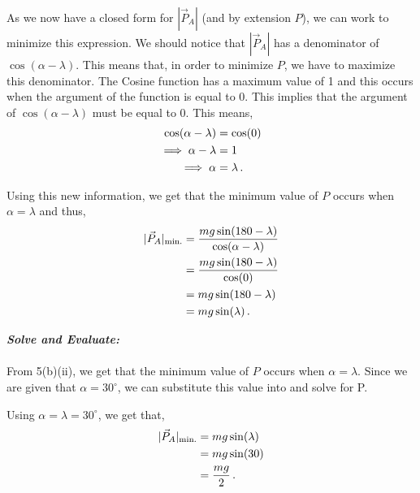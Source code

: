 \begin{subquestions}
\begin{subsubquestions}
	As we now have a closed form for $|\vec{P}_{A}|$ (and by extension $P$), we can work to minimize this expression. We should notice that $|\vec{P}_{A}|$ has a denominator of $\cos(\alpha - \lambda)$. This means that, in order to minimize $P$, we have to maximize this denominator. The Cosine function has a maximum value of 1 and this occurs when the argument of the function is equal to 0. This implies that the argument of $\cos(\alpha - \lambda)$ must be equal to 0. This means,
	\begin{align}
		\cos(\alpha - \lambda) & = \cos(0) \nonumber \\
		\implies \alpha - \lambda & = 1 \nonumber \\
		\implies \alpha & = \lambda \,.
	\end{align}
	
	Using this new information, we get that the minimum value of $P$ occurs when $\alpha=\lambda$ and thus,
	\begin{align}
		|\vec{P}_{A}|_{\text{min.}} & = \frac{mg\sin(180-\lambda)}{\cos(\alpha-\lambda)} \nonumber \\
		& = \frac{mg\sin(180-\lambda)}{\cos(0)} \nonumber \\
		& = mg\sin(180-\lambda) \nonumber \\
		& = mg\sin(\lambda) \,. \label{2014:q55:MinP}
	\end{align}

	
	\subsubquestion
	
	\textbf{\textit{Solve and Evaluate:}} \\ \\
	From 5(b)(ii), we get that the minimum value of $P$ occurs when $\alpha=\lambda$. Since we are given that $\alpha=30^\circ$, we can substitute this value into  and solve for P.
	
	Using $\alpha=\lambda=30^\circ$, we get that,
	\begin{align}
		|\vec{P}_{A}|_{\text{min.}} & = mg\sin(\lambda) \nonumber \\
		& = mg\sin(30) \nonumber \\
		& = \frac{mg}{2} \,.
	\end{align}
	
\end{subsubquestions}

\end{subquestions}